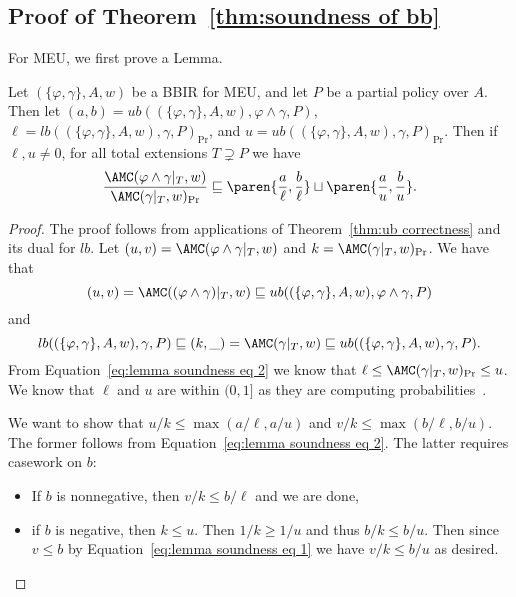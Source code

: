 \subsection{Proof of Theorem~\ref{thm:soundness of bb}}
\label{appendix:soundness of bb proof}

For MEU, we first prove a Lemma.

\begin{lemma}\label{lemma:soundness helper}
  Let $(\{\varphi, \gamma\}, A, w)$ be a BBIR for MEU,
  and let $P$ be a partial policy over $A$. Then 
  let $(a,b) = ub((\{\varphi, \gamma\}, A, w), \varphi \land \gamma, P)$,
  $\ell = lb((\{\varphi, \gamma\}, A, w), \gamma, P)_{\Pr}$, and
  $u = ub((\{\varphi, \gamma\}, A, w), \gamma, P)_{\Pr}$.
  Then if $\ell, u \neq 0$, for all total extensions $T \supsetneq P$ 
  we have
  \begin{equation}
    \frac{\AMC(\varphi\land \gamma|_T, w)}{\AMC(\gamma|_T, w)_{\Pr}}
    \sqsubseteq \paren{\frac a \ell, \frac b \ell}\sqcup \paren{\frac a u, \frac b u}.
  \end{equation}
\end{lemma}

\begin{proof}
  The proof follows from applications of
  Theorem~\ref{thm:ub correctness} and its dual for $lb$.
  Let $(u,v) = \AMC(\varphi\land \gamma|_T, w)$ and $k=\AMC(\gamma|_T, w)_{\Pr}$.
  We have that 
  \begin{equation}\label{eq:lemma soundness eq 1}
    (u,v) = \AMC((\varphi\land \gamma)|_T, w) \sqsubseteq
    ub((\{\varphi, \gamma\}, A, w), \varphi \land \gamma, P)
  \end{equation}
  and 
  \begin{equation}\label{eq:lemma soundness eq 2}
    lb((\{\varphi, \gamma\}, A, w), \gamma, P)
    \sqsubseteq (k, \_) = \AMC(\gamma|_T, w)
    \sqsubseteq ub((\{\varphi, \gamma\}, A, w), \gamma, P).
  \end{equation}
  From Equation~\ref{eq:lemma soundness eq 2}
  we know that $\ell \leq \AMC(\gamma|_T, w)_{\Pr} \leq u$.
  We know that $\ell$ and $u$ are within $(0,1]$ as they are 
  computing probabilities~\citep{darwiche2002knowledge}.

  We want to show that $u/k \leq \max(a/\ell, a/u)$ and 
  $v/k \leq \max(b/\ell, b/u)$. The former follows from
  Equation~\ref{eq:lemma soundness eq 2}. The latter requires casework on $b$:

  \begin{itemize}
    \item If $b$ is nonnegative, then $v/k \leq b/\ell$ and we are done,
    \item if $b$ is negative, then $k \leq u$. Then  $1/k \geq 1/u$
    and thus $b/k \leq b/u$. Then since $v \leq b$ by Equation~\ref{eq:lemma soundness eq 1}
    we have $v/k \leq b/u$ as desired.
  \end{itemize}

\end{proof}

